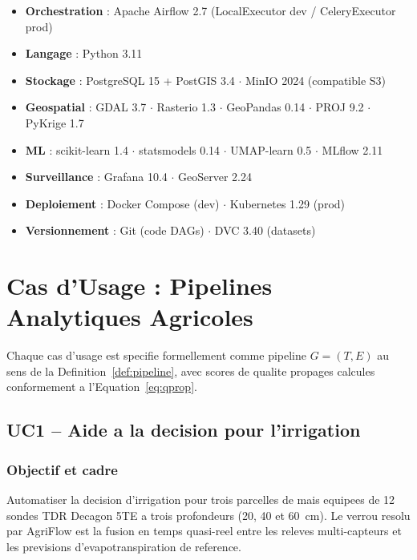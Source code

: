 \documentclass[12pt,a4paper]{article}
\theoremstyle{plain}
\theoremstyle{definition}
\theoremstyle{remark}
\begin{document}
	\begin{resultbox}
		\begin{itemize}[noitemsep,leftmargin=1.2em]
			\item \textbf{Orchestration} : Apache Airflow 2.7
			(LocalExecutor dev / CeleryExecutor prod)
			\item \textbf{Langage} : Python 3.11
			\item \textbf{Stockage} : PostgreSQL 15 + PostGIS 3.4 $\cdot$
			MinIO 2024 (compatible S3)
			\item \textbf{Geospatial} : GDAL 3.7 $\cdot$ Rasterio 1.3 $\cdot$
			GeoPandas 0.14 $\cdot$ PROJ 9.2 $\cdot$ PyKrige 1.7
			\item \textbf{ML} : scikit-learn 1.4 $\cdot$ statsmodels 0.14 $\cdot$
			UMAP-learn 0.5 $\cdot$ MLflow 2.11
			\item \textbf{Surveillance} : Grafana 10.4 $\cdot$ GeoServer 2.24
			\item \textbf{Deploiement} : Docker Compose (dev) $\cdot$
			Kubernetes 1.29 (prod)
			\item \textbf{Versionnement} : Git (code DAGs) $\cdot$
			DVC 3.40 (datasets)
		\end{itemize}
	\end{resultbox}
	
	\section{Cas d'Usage : Pipelines Analytiques Agricoles}
	\label{sec:usecases}
	
	Chaque cas d'usage est specifie formellement comme pipeline
	$G=(T,E)$ au sens de la Definition~\ref{def:pipeline}, avec
	scores de qualite propages calcules conformement a
	l'Equation~\eqref{eq:qprop}.
	
	\subsection{UC1 -- Aide a la decision pour l'irrigation}
	\label{subsec:uc1}
	
	\subsubsection{Objectif et cadre}
	
	Automatiser la decision d'irrigation pour trois parcelles de mais
	equipees de 12 sondes TDR Decagon 5TE a trois profondeurs
	(20, 40 et 60~cm). Le verrou resolu par AgriFlow est la fusion
	en temps quasi-reel entre les releves multi-capteurs et les
	previsions d'evapotranspiration de reference.
	
\end{document}
